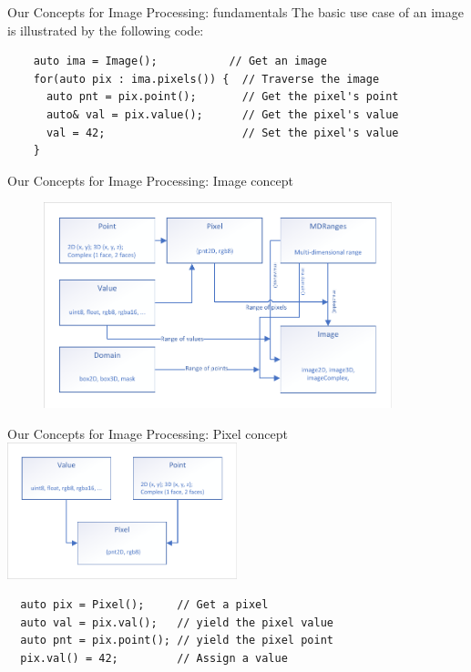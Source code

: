 \documentclass[12pt,aspectratio=169]{beamer}
\begin{document}
\begin{frame}[fragile]{Our Concepts for Image Processing: fundamentals}
  The basic use case of an image is illustrated by the following code:
  \begin{verbatim}
    auto ima = Image();           // Get an image
    for(auto pix : ima.pixels()) {  // Traverse the image
      auto pnt = pix.point();       // Get the pixel's point
      auto& val = pix.value();      // Get the pixel's value
      val = 42;                     // Set the pixel's value
    }
  \end{verbatim}
\end{frame}

\begin{frame}[fragile]{Our Concepts for Image Processing: Image concept}
  \centering
  \begin{figure}
    \includegraphics[width=0.9\textwidth]{../figures/concepts/image}
  \end{figure}
\end{frame}

\begin{frame}[fragile]{Our Concepts for Image Processing: Pixel concept}
  \centering
  \includegraphics[width=0.5\textwidth]{../figures/concepts/pixel}
  \begin{verbatim}
  auto pix = Pixel();     // Get a pixel
  auto val = pix.val();   // yield the pixel value
  auto pnt = pix.point(); // yield the pixel point
  pix.val() = 42;         // Assign a value
  \end{verbatim}
\end{frame}
\end{document}
